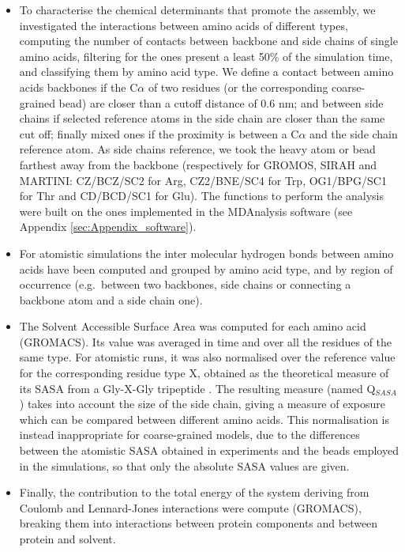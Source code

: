 \begin{itemize}
\item To characterise the chemical determinants that promote the assembly, we investigated the interactions between amino acids of different types, computing the number of contacts between backbone and side chains of single amino acids, filtering for the ones present a least 50\% of the simulation time, and classifying them by amino acid type.
%
We define a contact between amino acids backbones if the C$\alpha$ of two residues (or the corresponding coarse-grained bead) are closer than a cutoff distance of 0.6 nm; and between side chains if selected reference atoms in the side chain are closer than the same cut off; finally mixed ones if the proximity is between a C$\alpha$ and the side chain reference atom. As side chains reference, we took the heavy atom or bead farthest away from the backbone (respectively for GROMOS, SIRAH and MARTINI: CZ/BCZ/SC2 for Arg, CZ2/BNE/SC4 for Trp, OG1/BPG/SC1 for Thr and CD/BCD/SC1 for Glu). The functions to perform the analysis were built on the ones implemented in the MDAnalysis software (see Appendix \ref{sec:Appendix_software}).

\item For atomistic simulations the inter molecular hydrogen bonds between amino acids have been computed and grouped by amino acid type, and by region of occurrence (e.g.\ between two backbones, side chains or connecting a backbone atom and a side chain one).

\item The Solvent Accessible Surface Area was computed for each amino acid (GROMACS). Its value was averaged in time and over all the residues of the same type. For atomistic runs, it was also normalised over the reference value for the corresponding residue type X, obtained as the theoretical measure of its SASA from a Gly-X-Gly tripeptide \citep{Tien2013}. The resulting measure (named Q$_{SASA}$) takes into account the size of the side chain, giving a measure of exposure which can be compared between different amino acids. 
%
This normalisation is instead inappropriate for coarse-grained models, due to the differences between the atomistic SASA obtained in experiments and the beads employed in the simulations, so that only the absolute SASA values are given.

\item Finally, the contribution to the total energy of the system deriving from Coulomb and Lennard-Jones interactions were compute (GROMACS), breaking them into interactions between protein components and between protein and solvent.
\end{itemize}

